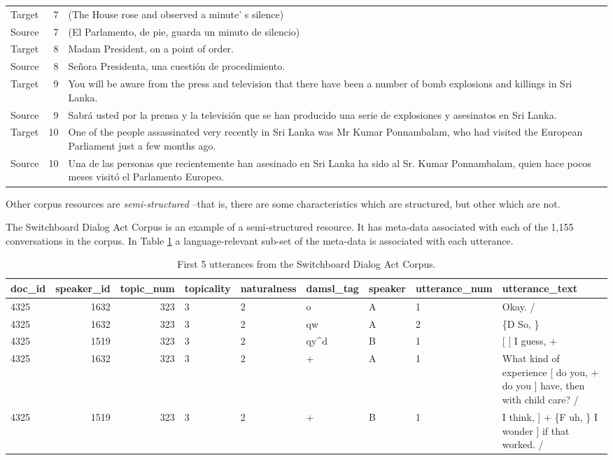 \documentclass[
]{article}
\begin{document}
\begin{table}
\begin{tabular}[t]{lrl}
Target & 7 & (The House rose and observed a minute' s silence)\\
Source & 7 & (El Parlamento, de pie, guarda un minuto de silencio)\\
Target & 8 & Madam President, on a point of order.\\
\addlinespace
Source & 8 & Señora Presidenta, una cuestión de procedimiento.\\
Target & 9 & You will be aware from the press and television that there have been a number of bomb explosions and killings in Sri Lanka.\\
Source & 9 & Sabrá usted por la prensa y la televisión que se han producido una serie de explosiones y asesinatos en Sri Lanka.\\
Target & 10 & One of the people assassinated very recently in Sri Lanka was Mr Kumar Ponnambalam, who had visited the European Parliament just a few months ago.\\
Source & 10 & Una de las personas que recientemente han asesinado en Sri Lanka ha sido al Sr. Kumar Ponnambalam, quien hace pocos meses visitó el Parlamento Europeo.\\
\bottomrule
\end{tabular}
\end{table}

Other corpus resources are \emph{semi-structured} --that is, there are some characteristics which are structured, but other which are not.

The Switchboard Dialog Act Corpus is an example of a semi-structured resource. It has meta-data associated with each of the 1,155 conversations in the corpus. In Table \ref{tab:structure-swda} a language-relevant sub-set of the meta-data is associated with each utterance.

\begin{table}

\caption{\label{tab:structure-swda}First 5 utterances from the Switchboard Dialog Act Corpus.}
\centering
\begin{tabular}[t]{lrrllllll}
\toprule
doc\_id & speaker\_id & topic\_num & topicality & naturalness & damsl\_tag & speaker & utterance\_num & utterance\_text\\
\midrule
4325 & 1632 & 323 & 3 & 2 & o & A & 1 & Okay.  /\\
4325 & 1632 & 323 & 3 & 2 & qw & A & 2 & \{D So, \}\\
4325 & 1519 & 323 & 3 & 2 & qy\textasciicircum{}d & B & 1 & {}[ [ I guess, +\\
4325 & 1632 & 323 & 3 & 2 & + & A & 1 & What kind of experience [ do you, + do you ] have, then with child care? /\\
4325 & 1519 & 323 & 3 & 2 & + & B & 1 & I think, ] + \{F uh, \} I wonder ] if that worked. /\\
\bottomrule
\end{tabular}
\end{table}
\end{document}
